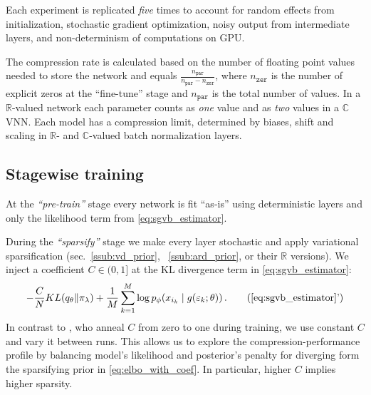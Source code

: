 \documentclass{article}
\newcommand{\real}{\mathbb{R}}
\newcommand{\cplx}{\mathbb{C}}
\begin{document}
Each experiment is replicated \emph{five} times to account for random effects from
initialization, stochastic gradient optimization, noisy output from intermediate layers,
and non-determinism of computations on GPU.

The compression rate is calculated based on the number of floating point values needed
to store the network and equals $
  \tfrac{n_\mathtt{par}}{n_\mathtt{par} - n_\mathtt{zer}}
$, where $n_\mathtt{zer}$ is the number of explicit zeros at the ``fine-tune'' stage
and $n_\mathtt{par}$ is the total number of values. In a $\real$-valued network each
parameter counts as \emph{one} value and as \emph{two} values in a $\cplx$VNN. Each
model has a compression limit, determined by biases, shift and scaling in $\real$-
and $\cplx$-valued batch normalization layers.

\subsection{Stagewise training} %
\label{sub:staging}

At the \emph{``pre-train''} stage every network is fit ``as-is'' using deterministic layers
and only the likelihood term from \eqref{eq:sgvb_estimator}.

During the \emph{``sparsify''} stage we make every layer stochastic and apply variational
sparsification (sec.~\ref{ssub:vd_prior}, ~\ref{ssub:ard_prior}, or their $\real$ versions).
We inject a coefficient $
  C \in (0, 1]
$ at the KL divergence term in \eqref{eq:sgvb_estimator}:
\begin{equation}  \label{eq:elbo_with_coef}
  - \frac{C}N KL(q_{\theta} \| \pi_{\lambda})
  + \frac1{M} \sum_{k=1}^M
      \log p_{\phi}(x_{i_k} \mid g(\varepsilon_k; \theta))
  \,.
  \tag{\ref{eq:sgvb_estimator}'}
\end{equation}
In contrast to \cite{molchanov_variational_2017}, who anneal $C$ from zero to one during
training, we use constant $C$ and vary it between runs. This allows us to explore the
compression-performance profile by balancing model's likelihood and posterior's penalty
for diverging form the sparsifying prior in \eqref{eq:elbo_with_coef}. In particular,
higher $C$ implies higher sparsity.
\end{document}
